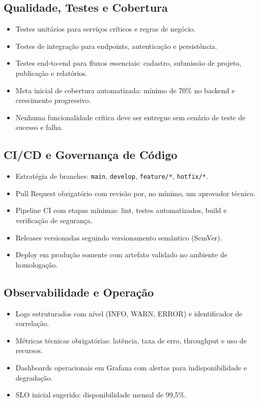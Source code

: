 \documentclass[12pt,a4paper]{article}
\begin{document}
\subsection{Qualidade, Testes e Cobertura}
\begin{itemize}[leftmargin=*]
  \item Testes unitários para serviços críticos e regras de negócio.
  \item Testes de integração para endpoints, autenticação e persistência.
  \item Testes end-to-end para fluxos essenciais: cadastro, submissão de projeto, publicação e relatórios.
  \item Meta inicial de cobertura automatizada: mínimo de 70\% no backend e crescimento progressivo.
  \item Nenhuma funcionalidade crítica deve ser entregue sem cenário de teste de sucesso e falha.
\end{itemize}

\subsection{CI/CD e Governança de Código}
\begin{itemize}[leftmargin=*]
  \item Estratégia de branches: \texttt{main}, \texttt{develop}, \texttt{feature/*}, \texttt{hotfix/*}.
  \item Pull Request obrigatório com revisão por, no mínimo, um aprovador técnico.
  \item Pipeline CI com etapas mínimas: lint, testes automatizados, build e verificação de segurança.
  \item Releases versionadas seguindo versionamento semântico (SemVer).
  \item Deploy em produção somente com artefato validado no ambiente de homologação.
\end{itemize}

\subsection{Observabilidade e Operação}
\begin{itemize}[leftmargin=*]
  \item Logs estruturados com nível (INFO, WARN, ERROR) e identificador de correlação.
  \item Métricas técnicas obrigatórias: latência, taxa de erro, throughput e uso de recursos.
  \item Dashboards operacionais em Grafana com alertas para indisponibilidade e degradação.
  \item SLO inicial sugerido: disponibilidade mensal de 99,5\%.
\end{itemize}
\end{document}

